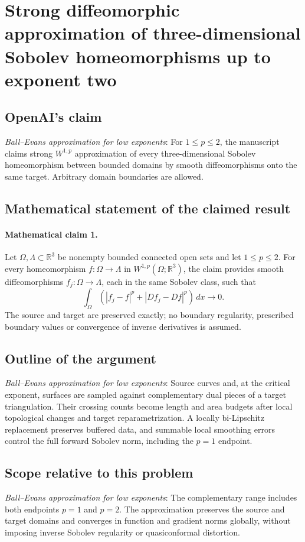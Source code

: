 \documentclass[11pt]{article}
\begin{document}
\section*{Strong diffeomorphic approximation of three-dimensional Sobolev homeomorphisms up to exponent two}

\subsection{OpenAI's claim}
\textit{Ball--Evans approximation for low exponents}: For $1\le p\le2$, the manuscript claims strong $W^{1,p}$ approximation of every three-dimensional Sobolev homeomorphism between bounded domains by smooth diffeomorphisms onto the same target. Arbitrary domain boundaries are allowed.

\subsection{Mathematical statement of the claimed result}
\paragraph{Mathematical claim 1.} Let $\Omega,\Lambda\subset\mathbb R^3$ be nonempty bounded connected open sets and let $1\le p\le2$. For every homeomorphism $f:\Omega\to\Lambda$ in $W^{1,p}(\Omega;\mathbb R^3)$, the claim provides smooth diffeomorphisms $f_j:\Omega\to\Lambda$, each in the same Sobolev class, such that \[\int_\Omega(|f_j-f|^p+|Df_j-Df|^p)\,dx\longrightarrow0.\] The source and target are preserved exactly; no boundary regularity, prescribed boundary values or convergence of inverse derivatives is assumed.

\subsection{Outline of the argument}
\textit{Ball--Evans approximation for low exponents}: Source curves and, at the critical exponent, surfaces are sampled against complementary dual pieces of a target triangulation. Their crossing counts become length and area budgets after local topological changes and target reparametrization. A locally bi-Lipschitz replacement preserves buffered data, and summable local smoothing errors control the full forward Sobolev norm, including the $p=1$ endpoint.

\subsection{Scope relative to this problem}
\textit{Ball--Evans approximation for low exponents}: The complementary range includes both endpoints $p=1$ and $p=2$. The approximation preserves the source and target domains and converges in function and gradient norms globally, without imposing inverse Sobolev regularity or quasiconformal distortion.
\end{document}
